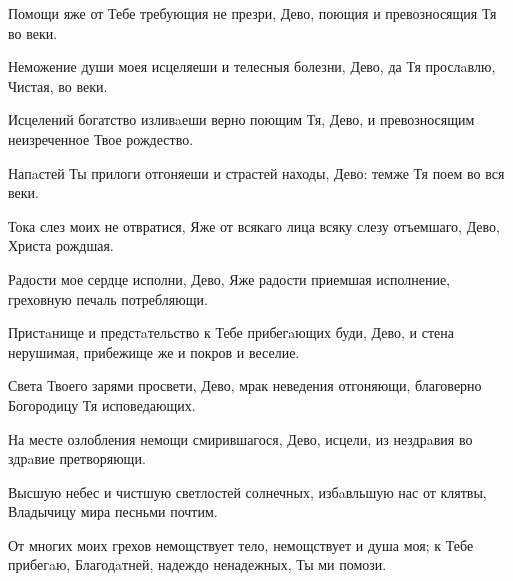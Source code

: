 \begin{mymulticols}



Помощи яже от Тебе требующия не презри, Дево, поющия и превозносящия Тя во веки.


Неможение души моея исцеляеши и телесныя болезни, Дево, да Тя прослaвлю, Чистая, во веки.

\slava

Исцелений богатство изливaеши верно поющим Тя, Дево, и превозносящим неизреченное Твое рождество.

\inyne

Напaстей Ты прилоги отгоняеши и страстей находы, Дево: темже Тя поем во вся веки.




Тока слез моих не отвратися, Яже от всякаго лица всяку слезу отъемшаго, Дево, Христа рождшая.


Радости мое сердце исполни, Дево, Яже радости приемшая исполнение, греховную печаль потребляющи.


Пристaнище и предстaтельство к Тебе прибегaющих буди, Дево, и стена нерушимая, прибежище же и покров и веселие.

\slava

Света Твоего зарями просвети, Дево, мрак неведения отгоняющи, благоверно Богородицу Тя исповедающих.

\inyne

На месте озлобления немощи смирившагося, Дево, исцели, из нездрaвия во здрaвие претворяющи.


Высшую небес и чистшую светлостей солнечных, избaвльшую нас от клятвы, Владычицу мира песньми почтим.

От многих моих грехов немощствует тело, немощствует и душа моя; к Тебе прибегaю, Благодaтней, надеждо ненадежных, Ты ми помози.


\end{mymulticols}
